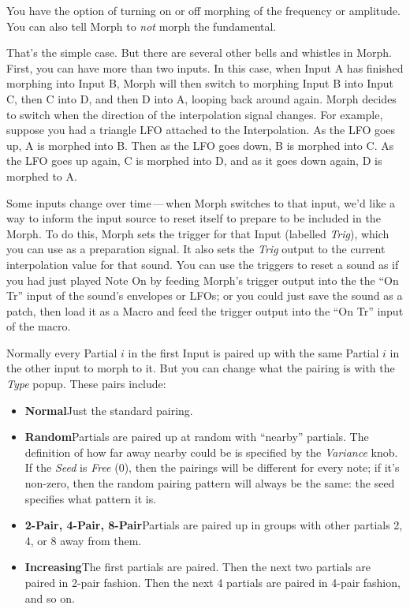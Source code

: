 \documentclass{article}
\begin{document}
You have the option of turning on or off morphing of the frequency or amplitude.  You can also tell Morph to {\it not} morph the fundamental.  

That's the simple case.  But there are several other bells and whistles in Morph.  First, you can have more than two inputs.  In this case, when Input A has finished morphing into Input B, Morph will then switch to morphing Input B into Input C, then C into D, and then D into A, looping back around again.  Morph decides to switch when the direction of the interpolation signal changes.  For example, suppose you had a triangle LFO attached to the Interpolation.  As the LFO goes up, A is morphed into B.  Then as the LFO goes down, B is morphed into C.  As the LFO goes up again, C is morphed into D, and as it goes down again, D is morphed to A.  

Some inputs change over time\,---\,when Morph switches to that input, we'd like a way to inform the input source to reset itself to prepare to be included in the Morph.  To do this, Morph sets the trigger for that Input (labelled {\it Trig}), which you can use as a preparation signal.  It also sets the {\it Trig} output to the current interpolation value for that sound.  You can use the triggers to reset a sound as if you had just played Note On by feeding Morph's trigger output into the the ``On Tr'' input of the sound's envelopes or LFOs; or you could just save the sound as a patch, then load it as a Macro and feed the trigger output into the ``On Tr'' input of the macro. 

Normally every Partial \(i\) in the first Input is paired up with the same Partial \(i\) in the other input to morph to it.  But you can change what the pairing is with the {\it Type} popup.  These pairs include:

\begin{itemize}
\item {\bf Normal}\qquad Just the standard pairing.
\item {\bf Random}\qquad Partials are paired up at random with ``nearby'' partials.  The definition of how far away nearby could be is specified by the {\it Variance} knob.  If the {\it Seed} is {\it Free} (0), then the pairings will be different for every note; if it's non-zero, then the random pairing pattern will always be the same: the seed specifies what pattern it is.
\item {\bf 2-Pair, 4-Pair, 8-Pair}\qquad Partials are paired up in groups with other partials 2, 4, or 8 away from them.
\item {\bf Increasing}\qquad The first partials are paired.  Then the next two partials are paired in 2-pair fashion.  Then the next 4 partials are paired in 4-pair fashion, and so on.
\end{itemize}
\end{document}
